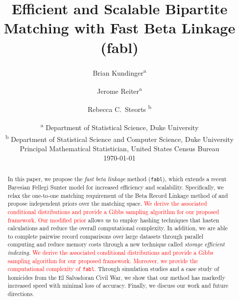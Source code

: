 \documentclass[12pt,letterpaper]{article}
\title{Efficient and Scalable Bipartite Matching with Fast Beta Linkage  (fabl)}
\author{Brian Kundinger\textsuperscript{a} \and
  Jerome Reiter\textsuperscript{a} \and 
  Rebecca C.~Steorts \textsuperscript{b}}
\date{
 \textsuperscript{a} Department of Statistical Science, Duke University \\
 \textsuperscript{b} Department of Statistical Science and Computer Science, Duke University\\Principal Mathematical Statistician, United States Census Bureau\\[2ex]
  \today}
\newcommand{\1}[1]{\mathbb{I}\!\left[#1\right]} %
\begin{document}
\maketitle

\bigskip
\begin{abstract}

In this paper, we propose the \emph{fast beta linkage} method (\texttt{fabl}), which extends a recent Bayesian Fellegi Sunter model for increased efficiency and scalability. Specifically, we relax the one-to-one matching requirement of the Beta Record Linkage method of \citep{sadinle_bayesian_2017} and propose independent priors over the matching space. \textcolor{red}{We derive the associated conditional distributions and provide a Gibbs sampling algorithm for our proposed framework.}
\textcolor{red}{Our modified prior} allows us to employ hashing techniques that hasten calculations and reduce the overall computational complexity.  In addition, we are able to complete pairwise record comparisons over large datasets through parallel computing and reduce memory costs through a new technique called \emph{storage efficient indexing}. \textcolor{red}{We derive the associated conditional distributions and provide a Gibbs sampling algorithm for our proposed framework.}
\textcolor{red}{Moreover, we provide the computational complexity of \texttt{fabl}.} Through simulation studies and a case study of homicides from the El Salvadoran Civil War, we show that our method has markedly increased speed with minimal loss of accuracy. Finally, we discuss our work and future directions. 
\end{abstract}
\end{document}
